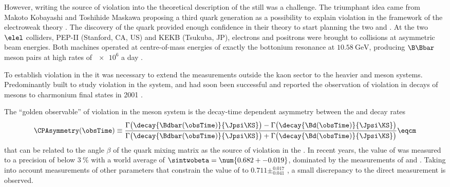 However, writing the source of \CP violation into the theoretical description of
the  \SM still was a challenge. The triumphant idea came from Makoto Kobayashi
and Toshihide Maskawa proposing a third quark generation as a possibility to
explain \CP violation in the framework of the electroweak theory
\cite{Kobayashi:1973fv}. The discovery of the \bquark quark
\cite{Herb:1977ek} provided enough confidence in their theory to start planning
the two \BFactories \Babar and \Belle. At the two $\elel$ colliders, PEP-II
(Stanford, CA, US) and KEKB (Tsukuba, JP), electrons and positrons were brought
to collisions at asymmetric beam energies. Both machines operated at
centre-of-mass energies of exactly the \YFourS bottonium resonance at
$\SI{10.58}{\GeV}$, producing $\B\Bbar$ meson pairs at high rates of $\num{e6}$
a day \cite{Bevan:2014iga}.

To establish \CP violation in the \SM it was necessary to extend
the measurements outside the kaon sector to the heavier \B and \D meson systems.
Predominantly built to study \CP violation in the \Bmeson system, \Babar and
\Belle had soon been successful and reported the observation of \CP violation in
decays of \Bd mesons to charmonium final states in 2001
\cite{Aubert:2001nu,Abe:2001xe}.

The \enquote{golden observable} \cite{Bevan:2014iga} of \CP violation in the \Bd
meson system is the decay-time dependent \CP asymmetry between the  \BdToJpsiKS
and \BdbarToJpsiKS decay rates
%
\begin{equation*}
    \CPAsymmetry(\obsTime) \equiv 
      \frac{\Gamma\bigl(\decay{\Bdbar(\obsTime)}{\Jpsi\KS}\bigr) - \Gamma\bigl(\decay{\Bd(\obsTime)}{\Jpsi\KS}\bigr)}
           {\Gamma\bigl(\decay{\Bdbar(\obsTime)}{\Jpsi\KS}\bigr) + \Gamma\bigl(\decay{\Bd(\obsTime)}{\Jpsi\KS}\bigr)} \eqcm
\end{equation*}
%
that can be related to the angle $\beta$ of the \CKM quark mixing matrix as the
source of \CP violation in the \SM \cite{Aaij:2015vza}. In recent years, the
value of \sintwobeta was measured to a precision of below $\SI{3}{\percent}$
with a world average of $\sintwobeta = \num{0.682 +- 0.019}$, dominated by the
measurements of \Babar and \Belle \cite{Amhis:2014hma}. Taking into account
measurements of other parameters that constrain the value of \sintwobeta to
$0.711\pm^{0.017}_{0.041}$
\cite{Charles:2015gya}, a small discrepancy to the direct measurement is
observed.

